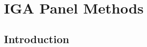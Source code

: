 


	
\chapter{IGA Panel Methods}
\label{ch:igapanel}


\section{Introduction}




\bigskip

 
{}

 
